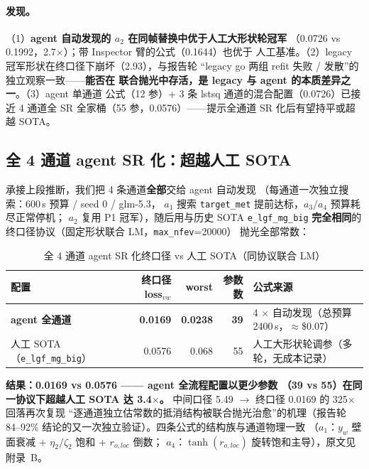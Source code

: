 \documentclass[11pt,a4paper]{ctexart}
\newcommand{\rol}{r_{o,loc}}
\newcommand{\yw}{y_w}
\newcommand{\et}{\eta_2}
\newcommand{\zt}{\zeta_2}
\begin{document}
\paragraph{发现。}
（1）\textbf{agent 自动发现的 $a_2$ 在同帧替换中优于人工大形状轮冠军}
（0.0726 vs 0.1992，2.7$\times$）；带 Inspector 臂的公式（0.1644）也优于
人工基准。（2）legacy 冠军形状在终口径下崩坏（2.93），与报告轮
``legacy go 两组 refit 失败 / 发散''的独立观察一致——\textbf{能否在
联合抛光中存活，是 legacy 与 agent 的本质差异之一}。（3）agent 单通道
公式（12 参）+ 3 条 lstsq 通道的混合配置（0.0726）已接近 4 通道全 SR
全家桶（55 参，0.0576）——提示全通道 SR 化后有望持平或超越 SOTA。

\subsection{全 4 通道 agent SR 化：超越人工 SOTA}\label{sec:fullagent}

承接上段推断，我们把 4 条通道\textbf{全部}交给 agent 自动发现
（每通道一次独立搜索：600\,s 预算 / seed 0 / glm-5.3，
$a_1$ 搜索 \texttt{target\_met} 提前达标，$a_3/a_4$ 预算耗尽正常停机；
$a_2$ 复用 P1 冠军），随后用与历史 SOTA \texttt{e\_lgf\_mg\_big}
\textbf{完全相同}的终口径协议（固定形状联合 LM，\texttt{max\_nfev}=20000）
抛光全部常数：

\begin{table}[htbp]\centering\small
\caption{全 4 通道 agent SR 化终口径 vs 人工 SOTA（同协议联合 LM）}
\begin{tabular}{@{}lrrrl@{}}
\toprule
配置 & 终口径 loss$_{vw}$ & worst & 参数数 & 公式来源 \\
\midrule
\textbf{agent 全通道} & \textbf{0.0169} & \textbf{0.0238} & \textbf{39} &
  4 $\times$ 自动发现（总预算 2400\,s，$\approx$\$0.07） \\
人工 SOTA（\texttt{e\_lgf\_mg\_big}） & 0.0576 & 0.068 & 55 &
  人工大形状轮调参（多轮，无成本记录） \\
\bottomrule
\end{tabular}
\end{table}

\textbf{结果：0.0169 vs 0.0576 —— agent 全流程配置以更少参数
（39 vs 55）在同一协议下超越人工 SOTA 达 3.4$\times$。}
中间口径 5.49 $\to$ 终口径 0.0169 的 325$\times$ 回落再次复现
``逐通道独立估常数的抵消结构被联合抛光治愈''的机理（报告轮
84--92\% 结论的又一次独立验证）。四条公式的结构族与通道物理一致
（$a_1$：$\yw$ 壁面衰减 + $\et/\zt$ 饱和 + $\rol$ 倒数；
$a_4$：$\tanh(\rol)$ 旋转饱和主导），原文见附录~B。
\end{document}
